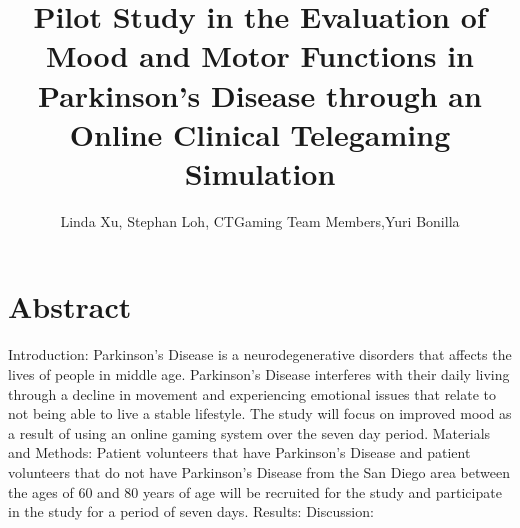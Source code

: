 \documentclass[12pt,letterpaper]{article}
\begin{document}
\title{Pilot Study in the Evaluation of Mood and Motor Functions in Parkinson's Disease through an Online Clinical Telegaming Simulation}
\author{Linda Xu, Stephan Loh, CTGaming Team Members,Yuri Bonilla}
\maketitle
 
\section{Abstract}
 Introduction: Parkinson's Disease is a neurodegenerative disorders that affects the lives of people in middle age. Parkinson's Disease interferes with their daily living through a decline in movement and experiencing emotional issues that relate to not being able to live a stable lifestyle. The study will focus on improved mood as a result of using an online gaming system over the seven day period. 
 Materials and Methods: Patient volunteers that have Parkinson's Disease and patient volunteers that do not have Parkinson's Disease from the San Diego area between the ages of 60 and 80 years of age will be recruited for the study and participate in the study for a period of seven days. 
 Results:
 Discussion:
 
\end{document}
